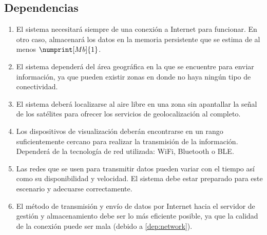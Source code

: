 \subsection*{Dependencias}
\begin{enumerate}[label=\textbf{\texttt{DEP-\arabic*}}]
  \item\label{dep:internet} El sistema necesitará siempre de una conexión a Internet para funcionar.
        En otro caso, almacenará los datos en la memoria persistente que se estima de al menos $\numprint[Mb]{1}$.
  \item\label{dep:connectivity} El sistema dependerá del área geográfica en la que se encuentre para enviar
        información, ya que pueden existir zonas en donde no haya ningún tipo de
        conectividad.
  \item\label{dep:gps} El sistema deberá localizarse al aire libre en una zona sin apantallar la señal de los satélites para
        ofrecer los servicios de geolocalización al completo.
  \item\label{dep:rt} Los dispositivos de visualización deberán encontrarse
        en un rango suficientemente cercano para realizar la transmisión de la
        información. Dependerá de la tecnología de red utilizada:
        WiFi, Bluetooth o \ac{BLE}.
  \item\label{dep:network} Las redes que se usen para transmitir datos pueden variar con el tiempo
        así como su disponibilidad y velocidad. El sistema debe estar preparado
        para este escenario y adecuarse correctamente.
  \item\label{dep:nt-speed} El método de transmisión y envío de datos por Internet hacia el servidor
        de gestión y almacenamiento debe ser lo más eficiente posible, ya que la
        calidad de la conexión puede ser mala (debido a \ref{dep:network}).
\end{enumerate}

